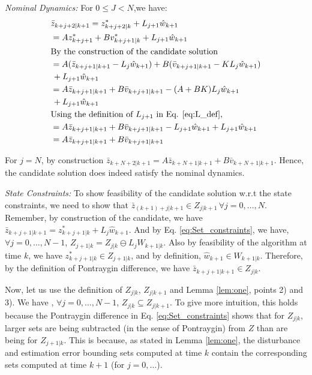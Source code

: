 \textit{ Nominal Dynamics:} For $0\leq J<N$,we have:
\begin{subequations}
\begin{align}
&\bar{z}_{k+j+2|k+1} = z^{*}_{k+j+2|k} + L_{j+1}\hat{w}_{k+1} \\
&= Az^{*}_{k+j+1}+Bv^{*}_{k+j+1|k} + L_{j+1}\hat{w}_{k+1} \\
& \text{By the construction of the candidate solution} \nonumber \\
& = A(\bar{z}_{k+j+1|k+1}-L_j\hat{w}_{k+1}) + B(\bar{v}_{k+j+1|k+1} - KL_j \hat{w}_{k+1}) \nonumber \\
&\, + L_{j+1}\hat{w}_{k+1} \\
& = A\bar{z}_{k+j+1|k+1} + B\bar{v}_{k+j+1|k+1} -(A+BK)L_j\hat{w}_{k+1} \nonumber \\
&\,+ L_{j+1}\hat{w}_{k+1} \\
&\text{Using the definition of $L_{j+1}$ in Eq. \ref{eq:L_def},} \nonumber \\
& = A\bar{z}_{k+j+1|k+1} + B\bar{v}_{k+j+1|k+1} - L_{j+1}\hat{w}_{k+1} + L_{j+1}\hat{w}_{k+1} \\
& = A\bar{z}_{k+j+1|k+1} + B\bar{v}_{k+j+1|k+1}
\end{align}
\end{subequations}

For $j=N$, by construction $\bar{z}_{k+N+2|k+1} = A\bar{z}_{k+N+1|k+1} + B\bar{v}_{k+N+1|k+1}$. Hence, the candidate solution does indeed satisfy the nominal dynamics.

\textit{State Constraints:} To show feasibility of the candidate solution w.r.t the state constraints, we need to show that $\bar{z}_{(k+1)+j|k+1}\in Z_{j|k+1}\, \forall j=0,\dotsc,N$. Remember, by construction of the candidate, we have $\bar{z}_{k+j+1|k+1} = z^{*}_{k+j+1|k} + L_j\hat{w}_{k+1}$. And by Eq. \ref{eq:Set_constraints}, we have, $\forall j=0,\dotsc,N-1$, $Z_{j+1|k} = Z_{j|k} \ominus L_jW_{k+1|k}$. Also by feasibility of the algorithm at time $k$, we have $z^{*}_{k+j+1|k}\in Z_{j+1|k}$, and by definition, $\hat{w}_{k+1} \in {W}_{k+1|k}$. Therefore, by the definition of Pontraygin difference, we have $\bar{z}_{k+j+1|k+1} \in Z_{j|k}$.

Now, let us use the definition of $Z_{j|k}, \,Z_{j|k+1}$ and Lemma \ref{lem:one}, points 2) and 3). We have , $\forall j=0,\dotsc,N-1$, $Z_{j|k} \subseteq  Z_{j|k+1}$. To give more intuition, this holds because the Pontraygin difference in Eq. \ref{eq:Set_constraints} shows that for $Z_{j|k}$, larger sets are being subtracted (in the sense of Pontraygin)  from $Z$ than are being for $Z_{j+1|k}$. This is because, as stated in Lemma \ref{lem:one}, the disturbance and estimation error bounding sets computed at time $k$ contain the corresponding sets computed at time $k+1$ (for $j=0,\dotsc$). 

